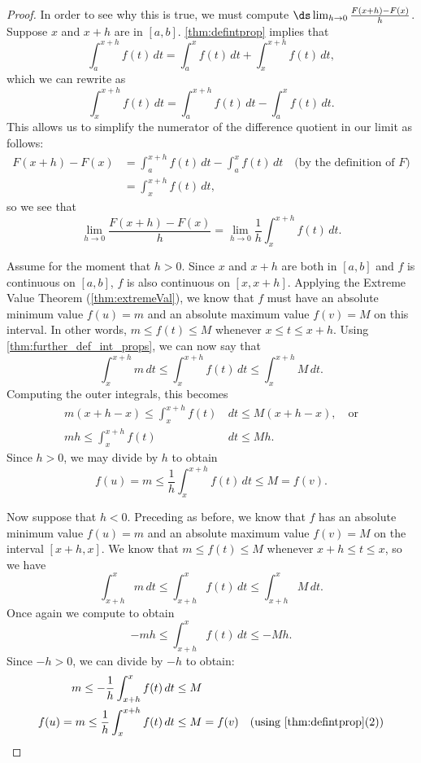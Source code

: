 \begin{proof}
In order to see why this is true, we must compute $\ds\lim_{h\to 0}\frac{F(x+h)-F(x)}{h}$. Suppose $x$ and $x+h$ are in $[a,b]$. \autoref{thm:defintprop} implies that
\[\int_a^{x+h}f(t)\,dt =\int_a^x f(t)\,dt+\int_x^{x+h} f(t)\,dt,\]
which we can rewrite as
\[\int_x^{x+h} f(t)\,dt=\int_a^{x+h} f(t)\,dt-\int_a^x f(t)\,dt.\]
This allows us to simplify the numerator of the difference quotient in our limit as follows:
\begin{align*}
F(x+h)-F(x)
&=\int_a^{x+h} f(t)\,dt-\int_a^x f(t)\,dt \quad\text{(by the definition of $F$)}\\
&=\int_x^{x+h} f(t)\,dt,
\end{align*}
so we see that
\[\lim_{h\to 0}\frac{F(x+h)-F(x)}{h}=\lim_{h\to 0}\frac 1h\int_x^{x+h} f(t)\,dt.\]

Assume for the moment that $h>0$. Since $x$ and $x+h$ are both in $[a,b]$ and $f$ is continuous on $[a,b]$, $f$ is also continuous on $[x,x+h]$. Applying the Extreme Value Theorem (\autoref{thm:extremeVal}), we know that $f$ must have an absolute minimum value $f(u)=m$ and an absolute maximum value $f(v)=M$ on this interval. In other words, $m\leq f(t)\leq M$ whenever $x\leq t\leq x+h$. Using \autoref{thm:further_def_int_props},
we can now say that
\[\int_x^{x+h} m\,dt \leq \int_x^{x+h} f(t)\,dt \leq \int_x^{x+h} M\,dt.\]
Computing the outer integrals, this becomes 
\begin{align*}
m(x+h-x)\leq \int_x^{x+h} f(t)&\,dt \leq M(x+h-x),\quad\text{or}\\
mh\leq \int_x^{x+h} f(t)&\,dt \leq Mh.
\end{align*}
Since $h>0$, we may divide by $h$ to obtain
\[f(u)=m\leq \frac1h\int_x^{x+h} f(t)\,dt \leq M=f(v).\]

Now suppose that $h<0$. Preceding as before, we know that $f$ has an absolute minimum value $f(u)=m$ and an absolute maximum value $f(v)=M$ on the interval $[x+h,x]$. We know that $m\leq f(t)\leq M$ whenever $x+h\leq t\leq x$, so we have \[\int_{x+h}^x m\,dt\leq\int_{x+h}^x f(t)\,dt\leq \int_{x+h}^x M\,dt.\] Once again we compute to obtain \[ -mh\leq \int_{x+h}^x f(t)\,dt \leq -Mh.\]
Since $-h>0$, we can divide by $-h$ to obtain:
\begin{align*}
m\leq -\frac1h\int_{x+h}^x f(t)&\,dt \leq M\\
f(u)=m\leq \frac1h \int_x^{x+h} f(t)&\,dt \leq M=f(v)
\quad\text{(using \autoref{thm:defintprop}(2))}\\
\end{align*}


\end{proof}
